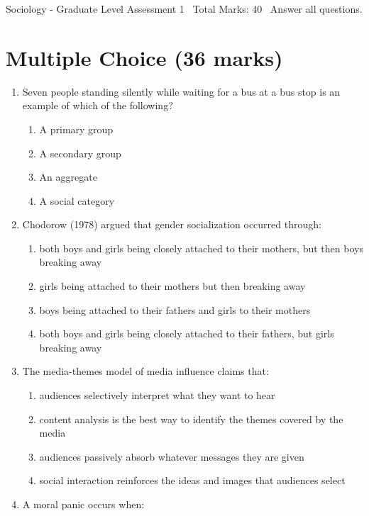 \documentclass[12pt]{article}
\begin{document}
\begin{center}
Sociology - Graduate Level Assessment 1 \
Total Marks: 40 \
Answer all questions.
\end{center}

\section*{Multiple Choice (36 marks)}
\begin{enumerate}[label=\arabic*.]
\item Seven people standing silently while waiting for a bus at a bus stop is an example of which of the following?
\begin{enumerate}[label=(\alph*)]
    \item A primary group
    \item A secondary group
    \item An aggregate
    \item A social category
\end{enumerate}
\item Chodorow (1978) argued that gender socialization occurred through:
\begin{enumerate}[label=(\alph*)]
    \item both boys and girls being closely attached to their mothers, but then boys breaking away
    \item girls being attached to their mothers but then breaking away
    \item boys being attached to their fathers and girls to their mothers
    \item both boys and girls being closely attached to their fathers, but girls breaking away
\end{enumerate}
\item The media-themes model of media influence claims that:
\begin{enumerate}[label=(\alph*)]
    \item audiences selectively interpret what they want to hear
    \item content analysis is the best way to identify the themes covered by the media
    \item audiences passively absorb whatever messages they are given
    \item social interaction reinforces the ideas and images that audiences select
\end{enumerate}
\item A moral panic occurs when:
\begin{enumerate}[label=(\alph*)]

\end{enumerate}
\end{enumerate}
\end{document}
